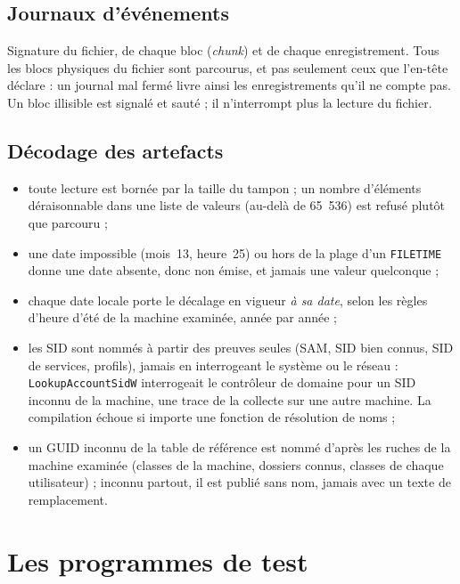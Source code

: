 \documentclass[11pt,a4paper,oneside]{report}
\begin{document}
\section{Journaux d'événements}

Signature du fichier, de chaque bloc (\emph{chunk}) et de chaque
enregistrement. Tous les blocs physiques du fichier sont parcourus, et pas
seulement ceux que l'en-tête déclare : un journal mal fermé livre ainsi les
enregistrements qu'il ne compte pas. Un bloc illisible est signalé et sauté ; il
n'interrompt plus la lecture du fichier.

\section{Décodage des artefacts}

\begin{itemize}
  \item toute lecture est bornée par la taille du tampon ; un nombre
    d'éléments déraisonnable dans une liste de valeurs (au-delà de 65~536) est
    refusé plutôt que parcouru ;
  \item une date impossible (mois~13, heure~25) ou hors de la plage d'un
    \texttt{FILETIME} donne une date absente, donc non émise, et jamais une
    valeur quelconque ;
  \item chaque date locale porte le décalage en vigueur \emph{à sa date},
    selon les règles d'heure d'été de la machine examinée, année par année ;
  \item les SID sont nommés à partir des preuves seules (SAM, SID bien connus,
    SID de services, profils), jamais en interrogeant le système ou le réseau :
    \texttt{LookupAccountSidW} interrogeait le contrôleur de domaine pour un
    SID inconnu de la machine, une trace de la collecte sur une autre machine.
    La compilation échoue si  importe une fonction de
    résolution de noms ;
  \item un GUID inconnu de la table de référence est nommé d'après les ruches
    de la machine examinée (classes de la machine, dossiers connus, classes de
    chaque utilisateur) ; inconnu partout, il est publié sans nom, jamais avec
    un texte de remplacement.
\end{itemize}

\chapter{Les programmes de test}\label{ch:harnais}
\end{document}
